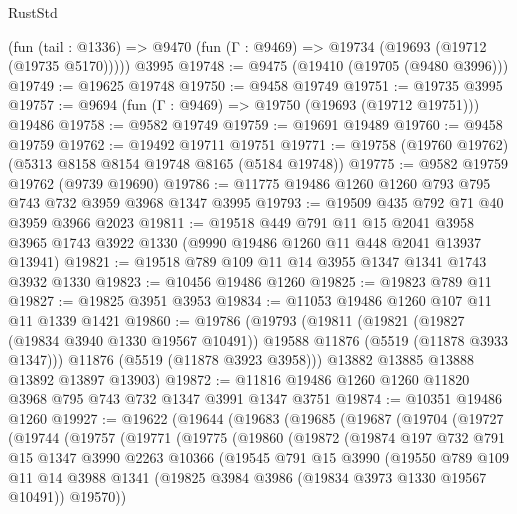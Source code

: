 \begin{lexlean}{RustStd}
\begin{coremodule}
    (fun (tail : @1336) => @9470 (fun (Γ : @9469) => @19734 (@19693 (@19712 (@19735 @5170)))))
    @3995
@19748 := @9475 (@19410 (@19705 (@9480 @3996)))
@19749 := @19625 @19748
@19750 := @9458 @19749
@19751 := @19735 @3995
@19757 := @9694 (fun (Γ : @9469) => @19750 (@19693 (@19712 @19751))) @19486
@19758 := @9582 @19749
@19759 := @19691 @19489
@19760 := @9458 @19759
@19762 := @19492 @19711 @19751
@19771 := @19758 (@19760 @19762) (@5313 @8158 @8154 @19748 @8165 (@5184 @19748))
@19775 := @9582 @19759 @19762 (@9739 @19690)
@19786 := @11775 @19486 @1260 @1260 @793 @795 @743 @732 @3959 @3968 @1347 @3995
@19793 := @19509 @435 @792 @71 @40 @3959 @3966 @2023
@19811 := @19518
    @449
    @791
    @11
    @15
    @2041
    @3958
    @3965
    @1743
    @3922
    @1330
    (@9990 @19486 @1260 @11 @448 @2041 @13937 @13941)
@19821 := @19518 @789 @109 @11 @14 @3955 @1347 @1341 @1743 @3932 @1330
@19823 := @10456 @19486 @1260
@19825 := @19823 @789 @11
@19827 := @19825 @3951 @3953
@19834 := @11053 @19486 @1260 @107 @11 @11 @1339 @1421
@19860 := @19786
    (@19793
      (@19811
        (@19821
          (@19827 (@19834 @3940 @1330 @19567 @10491))
          @19588
          @11876
          (@5519 (@11878 @3933 @1347)))
        @11876
        (@5519 (@11878 @3923 @3958)))
      @13882
      @13885
      @13888
      @13892
      @13897
      @13903)
@19872 := @11816 @19486 @1260 @1260 @11820 @3968 @795 @743 @732 @1347 @3991 @1347 @3751
@19874 := @10351 @19486 @1260
@19927 := @19622
    (@19644
      (@19683
        (@19685
          (@19687
            (@19704
              (@19727
                (@19744
                  (@19757
                    (@19771
                      (@19775
                        (@19860
                          (@19872
                            (@19874
                              @197
                              @732
                              @791
                              @15
                              @1347
                              @3990
                              @2263
                              @10366
                              (@19545
                                @791
                                @15
                                @3990
                                (@19550
                                  @789
                                  @109
                                  @11
                                  @14
                                  @3988
                                  @1341
                                  (@19825 @3984 @3986 (@19834 @3973 @1330 @19567 @10491))
                                  @19570))

\end{coremodule}
\end{lexlean}
